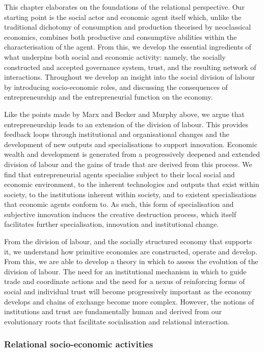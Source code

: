This chapter elaborates on the foundations of the relational perspective. Our starting point is the social actor and economic agent itself which, unlike the traditional dichotomy of consumption and production theorised by neoclassical economics, combines both productive and consumptive abilities within the characterisation of the agent. From this, we develop the essential ingredients of what underpins both social and economic activity: namely, the socially constructed and accepted governance system, trust, and the resulting network of interactions. Throughout we develop an insight into the social division of labour by introducing socio-economic roles, and discussing the consequences of entrepreneurship and the entrepreneurial function on the economy.

Like the points made by Marx and Becker and Murphy above, we argue that entrepreneurship leads to an extension of the division of labour. This provides feedback loops through institutional and organisational changes and the development of new outputs and specialisations to support innovation. Economic wealth and development is generated from a progressively deepened and extended division of labour and the gains of trade that are derived from this process. We find that entrepreneurial agents specialise subject to their local social and economic environment, to the inherent technologies and outputs that exist within society, to the institutions inherent within society, and to existent specialisations that economic agents conform to. As such, this form of specialisation and subjective innovation induces the creative destruction process, which itself facilitates further specialisation, innovation and institutional change.

From the division of labour, and the socially structured economy that supports it, we understand how primitive economies are constructed, operate and develop. From this, we are able to develop a theory in which to assess the evolution of the division of labour. The need for an institutional mechanism in which to guide trade and coordinate actions and the need for a nexus of reinforcing forms of social and individual trust will become progressively important as the economy develops and chains of exchange become more complex. However, the notions of institutions and trust are fundamentally human and derived from our evolutionary roots that facilitate socialisation and relational interaction.

\subsubsection{Relational socio-economic activities}

